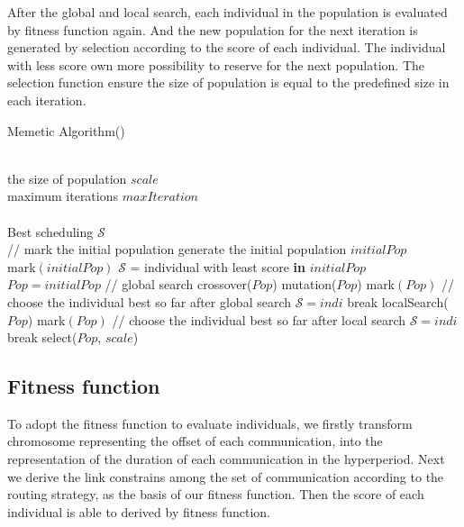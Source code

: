 \documentclass[jornal]{IEEEtran}
\begin{document}
After the global and local search, each individual in the population is evaluated by fitness function again. And the new population for the next iteration is generated by selection according to the score of each individual. The individual with less score own more possibility to reserve for the next population. The selection function ensure the size of population is equal to the predefined size in each iteration.

\begin{algorithm}[tb]
	\caption{Memetic Algorithm()}
	\renewcommand{\algorithmicrequire}{\textbf{Input:}}
	\renewcommand{\algorithmicensure}{\textbf{Output:}}
	\begin{algorithmic}[1]
		\REQUIRE~~\\
		the size of population $scale$\\
		maximum iterations $maxIteration$\\
		\ENSURE~~\\
		Best scheduling $\mathcal{S}$\\
			\STATE // mark the initial population
				\STATE generate the	initial population $initialPop$\\
				\STATE mark$(initialPop)$
				\STATE $\mathcal{S}$ = individual with least score \textbf{in} $initialPop$
				\STATE $Pop = initialPop$
			\ELSE
			\STATE // global search
				\STATE crossover($Pop$)
				\STATE mutation($Pop$)
				\STATE mark$(Pop)$
			\ENDIF
			\STATE // choose the individual best so far after global search
					\STATE $\mathcal{S}=indi$
				\ENDIF
					\STATE break
				\ENDIF
			\ENDFOR	
			\STATE localSearch($Pop$)
			\STATE mark$(Pop)$
			\STATE // choose the individual best so far after local search
					\STATE $\mathcal{S}=indi$
				\ENDIF
					\STATE break
				\ENDIF
			\ENDFOR			
			\STATE select($Pop$, $scale$)
		\ENDFOR
	\end{algorithmic}
\end{algorithm}	

\subsection{Fitness function}

To adopt the fitness function to evaluate individuals, we firstly transform chromosome representing the offset of each communication, into the representation of the duration of each communication in the hyperperiod. Next we derive the link constrains among the set of communication according to the routing strategy, as the basis of our fitness function. Then the score of each individual is able to derived by fitness function.
\end{document}
